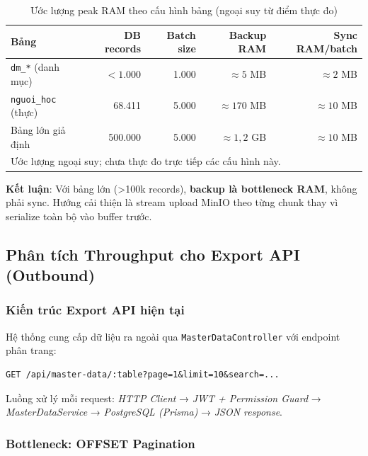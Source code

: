 \begin{table}[H]
\centering
\caption{Ước lượng peak RAM theo cấu hình bảng (ngoại suy từ điểm thực đo)}
\label{tab:ram-estimate}
\begin{tabular}{lrrrr}
\toprule
\textbf{Bảng} & \textbf{DB records} & \textbf{Batch size} &
\textbf{Backup RAM} & \textbf{Sync RAM/batch} \\
\midrule
\texttt{dm\_*} (danh mục)  & $<1.000$   & 1.000  & $\approx 5$ MB   & $\approx 2$ MB \\
\texttt{nguoi\_hoc} (thực) & 68.411     & 5.000  & $\approx 170$ MB & $\approx 10$ MB \\
Bảng lớn giả định         & 500.000    & 5.000  & $\approx 1,2$ GB & $\approx 10$ MB \\
\bottomrule
\multicolumn{5}{l}{\footnotesize Ước lượng ngoại suy; chưa thực đo trực tiếp các cấu hình này.}
\end{tabular}
\end{table}

\textbf{Kết luận}: Với bảng lớn (>100k records), \textbf{backup là
bottleneck RAM}, không phải sync. Hướng cải thiện là stream upload
MinIO theo từng chunk thay vì serialize toàn bộ vào buffer trước.

\subsection{Phân tích Throughput cho Export API (Outbound)}
\label{sec:perf-export}

\subsubsection{Kiến trúc Export API hiện tại}

Hệ thống cung cấp dữ liệu ra ngoài qua \texttt{MasterDataController}
với endpoint phân trang:

\begin{verbatim}
GET /api/master-data/:table?page=1&limit=10&search=...
\end{verbatim}

Luồng xử lý mỗi request: \textit{HTTP Client} → \textit{JWT +
Permission Guard} → \textit{MasterDataService} →
\textit{PostgreSQL (Prisma)} → \textit{JSON response}.

\subsubsection{Bottleneck: OFFSET Pagination}

